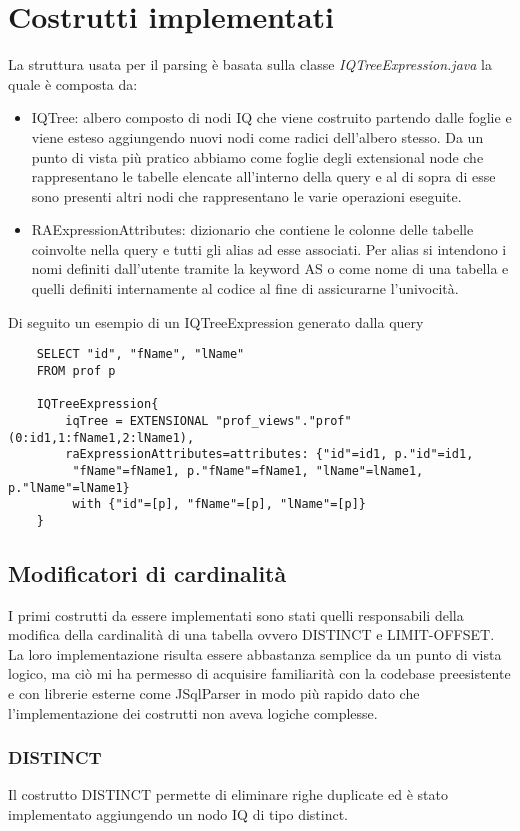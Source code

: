 \section{Costrutti implementati}
\label{sec:implementation}
La struttura usata per il parsing è basata sulla classe \textit{IQTreeExpression.java} la quale è composta da:
\begin{itemize}
    \item IQTree: albero composto di nodi IQ che viene costruito partendo dalle foglie e viene esteso aggiungendo nuovi nodi come radici dell'albero stesso. Da un punto di vista
          più pratico abbiamo come foglie degli extensional node che rappresentano le tabelle elencate all'interno della query e al di sopra di esse sono presenti altri nodi che
          rappresentano le varie operazioni eseguite.
    \item RAExpressionAttributes: dizionario che contiene le colonne delle tabelle coinvolte nella query e tutti gli alias ad esse associati. Per alias si intendono i nomi definiti
          dall'utente tramite la keyword AS o come nome di una tabella e quelli definiti internamente al codice al fine di assicurarne l'univocità.
\end{itemize}
Di seguito un esempio di un IQTreeExpression generato dalla query
\begin{verbatim}
    SELECT "id", "fName", "lName"
    FROM prof p

    IQTreeExpression{
        iqTree = EXTENSIONAL "prof_views"."prof"(0:id1,1:fName1,2:lName1), 
        raExpressionAttributes=attributes: {"id"=id1, p."id"=id1, 
         "fName"=fName1, p."fName"=fName1, "lName"=lName1, p."lName"=lName1} 
         with {"id"=[p], "fName"=[p], "lName"=[p]}
    } 
    \end{verbatim}

\subsection{Modificatori di cardinalità}
I primi costrutti da essere implementati sono stati quelli responsabili della modifica della cardinalità di una tabella ovvero DISTINCT e LIMIT-OFFSET. La loro implementazione
risulta essere abbastanza semplice da un punto di vista logico, ma ciò mi ha permesso di acquisire familiarità con la codebase preesistente e con librerie esterne come JSqlParser
in modo più rapido dato che l'implementazione dei costrutti non aveva logiche complesse.

\subsubsection*{DISTINCT}
Il costrutto DISTINCT permette di eliminare righe duplicate ed è stato implementato aggiungendo un nodo IQ di tipo distinct.

